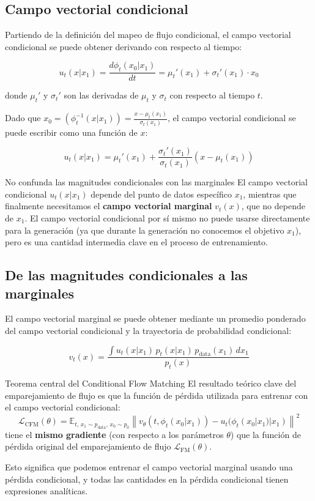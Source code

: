 \subsection{Campo vectorial condicional}

Partiendo de la definición del mapeo de flujo condicional, el campo vectorial condicional se puede obtener derivando con respecto al tiempo:

$$u_t(x | x_1) = \frac{d\phi_t(x_0 | x_1)}{dt} = \mu_t'(x_1) + \sigma_t'(x_1) \cdot x_0$$

donde $\mu_t'$ y $\sigma_t'$ son las derivadas de $\mu_t$ y $\sigma_t$ con respecto al tiempo $t$.

Dado que $x_0 = (\phi_t^{-1}(x | x_1)) = \frac{x - \mu_t(x_1)}{\sigma_t(x_1)}$, el campo vectorial condicional se puede escribir como una función de $x$:

$$u_t(x | x_1) = \mu_t'(x_1) + \frac{\sigma_t'(x_1)}{\sigma_t(x_1)} \left( x - \mu_t(x_1) \right)$$

\begin{warningbox}{No confunda las magnitudes condicionales con las marginales}
El campo vectorial condicional $u_t(x | x_1)$ depende del punto de datos específico $x_1$, mientras que finalmente necesitamos el \textbf{campo vectorial marginal} $v_t(x)$, que no depende de $x_1$. El campo vectorial condicional por sí mismo no puede usarse directamente para la generación (ya que durante la generación no conocemos el objetivo $x_1$), pero es una cantidad intermedia clave en el proceso de entrenamiento.
\end{warningbox}

\subsection{De las magnitudes condicionales a las marginales}

El campo vectorial marginal se puede obtener mediante un promedio ponderado del campo vectorial condicional y la trayectoria de probabilidad condicional:

$$v_t(x) = \frac{\int u_t(x | x_1) \, p_t(x | x_1) \, p_{\text{data}}(x_1) \, dx_1}{p_t(x)}$$

\begin{importantbox}{Teorema central del Conditional Flow Matching}
El resultado teórico clave del emparejamiento de flujo es que la función de pérdida utilizada para entrenar con el campo vectorial condicional:
$$\mathcal{L}_{\text{CFM}}(\theta) = \mathbb{E}_{t, \, x_1 \sim p_{\text{data}}, \, x_0 \sim p_0} \left\| v_\theta(t, \phi_t(x_0 | x_1)) - u_t(\phi_t(x_0 | x_1) | x_1) \right\|^2$$
tiene el \textbf{mismo gradiente} (con respecto a los parámetros $\theta$) que la función de pérdida original del emparejamiento de flujo $\mathcal{L}_{\text{FM}}(\theta)$.

Esto significa que podemos entrenar el campo vectorial marginal usando una pérdida condicional, y todas las cantidades en la pérdida condicional tienen expresiones analíticas.
\end{importantbox}

